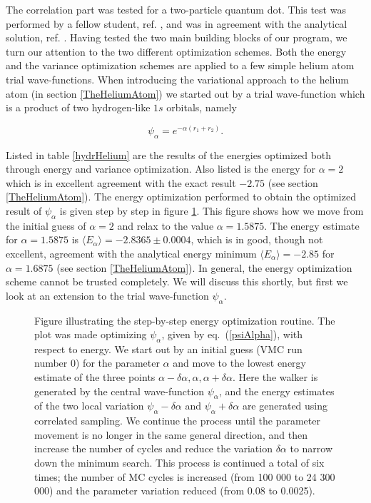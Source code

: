 The correlation part was tested for a two-particle quantum dot. This
test was performed by a fellow student, ref. \cite{popsueva2004}, and
was in agreement with the analytical solution,
ref. \cite{dineykhan1997}.
\newline
%
\newline
Having tested the two main building blocks of our program, 
we turn our attention to the two different optimization schemes.
Both the energy and the variance optimization schemes are applied
to a few simple helium atom trial wave-functions. When introducing the
variational approach to the helium atom (in section
\ref{TheHeliumAtom}) we started out by a trial wave-function which is
a product of two hydrogen-like $1s$ orbitals, namely 

\begin{equation} 
  \psi_{\alpha} = e^{-\alpha (r_1+r_2)}.
\label{psiAlpha}
\end{equation}

Listed in table \ref{hydrHelium} are the results of the energies
optimized both through energy and variance optimization. Also listed
is the energy for $\alpha = 2$ which is in excellent agreement with
the exact result $-2.75$ (see section \ref{TheHeliumAtom}).
The energy optimization performed to obtain the
optimized result of $\psi_{\alpha}$ is given step by step in figure
\ref{parameterWalkAlpha}. This figure shows how we move from the
initial guess of $\alpha = 2$ and relax to the value $\alpha =
1.5875$. The energy estimate for $\alpha = 1.5875$ is $\langle
E_{\alpha} \rangle = -2.8365 \pm 0.0004$, which is in good, though not
excellent, agreement with the analytical energy minimum $\langle
E_{\alpha} \rangle = -2.85$ for $\alpha = 1.6875$ (see section
\ref{TheHeliumAtom}). In general, the energy optimization scheme
cannot be trusted completely. We will discuss this
shortly, but first we look at an extension to the trial
wave-function $\psi_{\alpha}$.
\newline


\begin{figure}[hbtp]
  
  \caption{ Figure illustrating the step-by-step energy optimization
  routine. The plot was made optimizing $\psi_{\alpha}$, given by
  eq.~(\ref{psiAlpha}), with respect to energy.  We start out
  by an initial guess (VMC run number 0) for the parameter $\alpha$
  and move to the lowest energy estimate of the three points
  $\alpha-\delta\alpha, \alpha, \alpha+\delta\alpha$. Here the
  walker is generated by the central wave-function $\psi_{\alpha}$,
  and the energy estimates of the two local variation
  $\psi_{\alpha}-\delta\alpha$ and $\psi_{\alpha}+\delta\alpha$ are
  generated using correlated sampling.  We continue the process 
  until the parameter movement is no longer in the same general
  direction, and then increase the number of cycles and reduce the
  variation $\delta\alpha$ to narrow down the minimum search. This
  process is continued a total of six times; the number of MC cycles
  is increased (from 100 000 to 24 300 000) and the  parameter
  variation reduced (from 0.08 to 0.0025).
  }
  \label{parameterWalkAlpha}
\end{figure}

